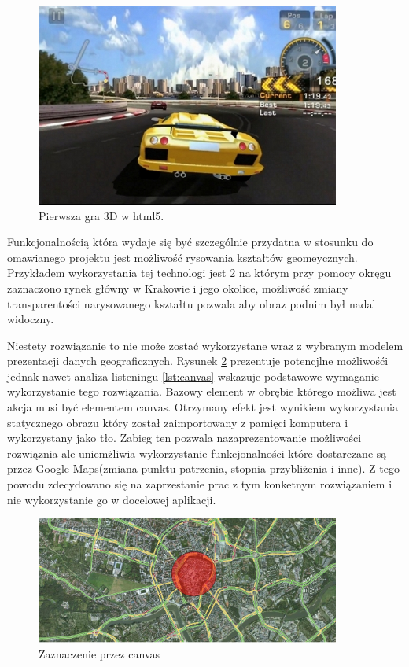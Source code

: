 \begin{figure}[H]
  \centering
    \includegraphics[width=100mm]{ge/html5_3d.jpg}
  \caption{Pierwsza gra 3D w html5.}
  \label{fig:html3d}
\end{figure}

Funkcjonalnością która wydaje się być szczególnie przydatna w stosunku do omawianego projektu jest możliwość rysowania kształtów geomeycznych. Przykładem wykorzystania tej technologi jest \ref{fig:canvas1} na którym przy pomocy okręgu zaznaczono rynek główny w Krakowie i jego okolice, możliwość zmiany transparentości narysowanego kształtu pozwala aby obraz podnim był nadal widoczny.

Niestety rozwiązanie to nie może zostać wykorzystane wraz z wybranym modelem prezentacji danych geograficznych. Rysunek \ref{fig:canvas1} prezentuje potencjlne możliwośći jednak nawet analiza listeningu \ref{lst:canvas} wskazuje podstawowe wymaganie wykorzystanie tego rozwiązania. Bazowy element w obrębie którego możliwa jest akcja musi być elementem canvas.
Otrzymany efekt jest wynikiem wykorzystania statycznego obrazu który został zaimportowany z pamięci komputera i wykorzystany jako tło. Zabieg ten pozwala nazaprezentowanie możliwości rozwiąznia ale uniemżliwia wykorzystanie funkcjonalności które dostarczane są przez Google Maps(zmiana punktu patrzenia, stopnia przybliżenia i inne). Z tego powodu zdecydowano się na zaprzestanie prac z tym konketnym rozwiązaniem i nie wykorzystanie go w docelowej aplikacji.

  \begin{figure}[H]
  \centering
    \includegraphics[width=100mm]{ge/canvas1.jpg}
  \caption{Zaznaczenie przez canvas}
  \label{fig:canvas1}
\end{figure}

